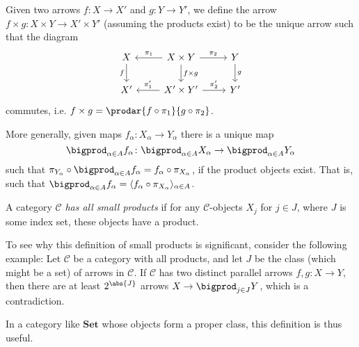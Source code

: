 \documentclass[article, a4paper, 11pt, oneside]{memoir}
\numberwithin{equation}{chapter}
\newcommand{\cat}[1]{\mathcal{#1}}
\newcommand{\ncat}[1]{\mathbf{#1}} %
\newcommand{\catSet}{\ncat{Set}}
\newcommand{\catC}{\cat{C}}
\theoremstyle{myexample}
\theoremstyle{myexamplebreak}
\begin{document}
Given two arrows $f \colon X \to X'$ and $g \colon Y \to Y'$, we define the arrow $f \times g \colon X \times Y \to X' \times Y'$ (assuming the products exist) to be the unique arrow such that the diagram
%
\begin{equation*}
    \begin{tikzcd}
        X
            \ar[d, "f", swap]
        & X \times Y
            \ar[l, "\pi_1", swap]
            \ar[r, "\pi_2"]
            \ar[d, "f \times g"]
        & Y
            \ar[d, "g"]
        \\
        X'
        & X' \times Y'
            \ar[l, "\pi'_1", swap]
            \ar[r, "\pi'_2"]
        & Y'
    \end{tikzcd}
\end{equation*}
%
commutes, i.e. $f \times g = \prodar{f \circ \pi_1}{g \circ \pi_2}$.

More generally, given maps $f_\alpha \colon X_\alpha \to Y_\alpha$ there is a unique map
%
\begin{equation*}
    \bigprod_{\alpha \in A} f_\alpha
        \colon \bigprod_{\alpha \in A} X_\alpha
        \to \bigprod_{\alpha \in A} Y_\alpha
\end{equation*}
%
such that $\pi_{Y_\alpha} \circ \bigprod_{\alpha \in A} f_\alpha = f_\alpha \circ \pi_{X_\alpha}$, if the product objects exist. That is, such that $\bigprod_{\alpha \in A} f_\alpha = \langle f_\alpha \circ \pi_{X_\alpha} \rangle_{\alpha \in A}$.



\begin{definition}
    A category $\catC$ \emph{has all small products} if for any $\catC$-objects $X_j$ for $j \in J$, where $J$ is some index set, these objects have a product.
\end{definition}

\begin{remark}
    To see why this definition of small products is significant, consider the following example: Let $\catC$ be a category with all products, and let $J$ be the class (which might be a set) of arrows in $\catC$. If $\catC$ has two distinct parallel arrows $f,g \colon X \to Y$, then there are at least $2^{\abs{J}}$ arrows $X \to \bigprod_{j \in J} Y$, which is a contradiction.

    In a category like $\catSet$ whose objects form a proper class, this definition is thus useful.
\end{remark}
\end{document}
